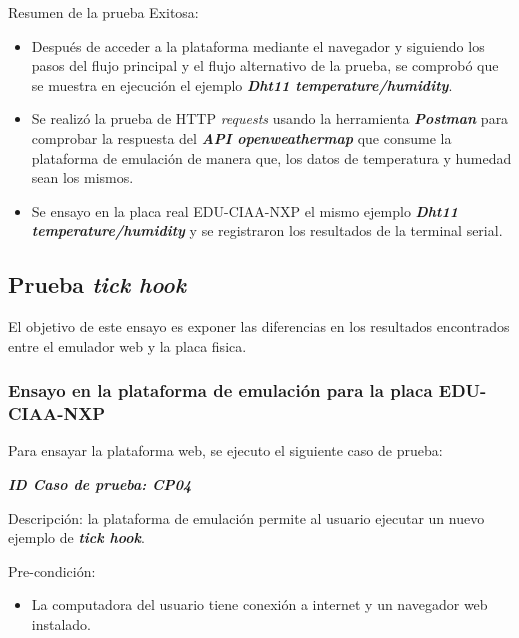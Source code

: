 Resumen de la prueba Exitosa:
\begin{itemize}
	\item Después de acceder a la plataforma mediante el navegador y siguiendo los pasos del flujo principal y el flujo alternativo de la prueba, se comprobó que se muestra en ejecución el ejemplo \textit{\textbf{Dht11 temperature/humidity}}.
	\item Se realizó la prueba de HTTP \textit{requests} usando la herramienta \textit{\textbf{Postman}} para comprobar la respuesta del \textit{\textbf{API openweathermap}} que consume la plataforma de emulación de manera que, los datos de temperatura y humedad sean los mismos.
	\item Se ensayo en la placa real EDU-CIAA-NXP  el mismo ejemplo \textit{\textbf{Dht11 temperature/humidity}} y se registraron los resultados de la terminal serial.

\end{itemize}


\subsection{ Prueba \textit{\textbf{tick hook}}}
El objetivo de este ensayo es exponer las diferencias en los resultados encontrados entre el emulador web y la placa fisica.

\subsubsection{Ensayo en la plataforma de emulación para la placa EDU-CIAA-NXP} 
Para ensayar la plataforma web, se ejecuto el siguiente caso de prueba:

\textit{\textbf{ID Caso de prueba: CP04}}

Descripción: la plataforma de emulación permite al usuario ejecutar un nuevo ejemplo de \textit{\textbf{tick hook}}.

Pre-condición: 
\begin{itemize}
	\item La computadora del usuario tiene conexión a internet y un navegador web instalado.
\end{itemize}

